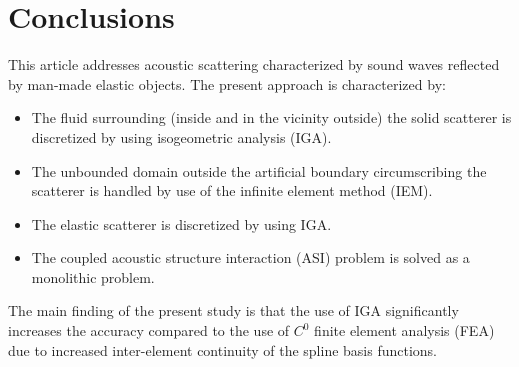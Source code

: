 \newpage
\section{Conclusions}
\label{Sec2:conclusions}
This article addresses acoustic scattering characterized by sound waves reflected by man-made elastic objects. The present approach is characterized by:
\begin{itemize}
	\item The fluid surrounding (inside and in the vicinity outside) the solid scatterer is discretized by using isogeometric analysis (IGA).
	\item The unbounded domain outside the artificial boundary circumscribing the scatterer is handled by use of the infinite element method (IEM).
	\item The elastic scatterer is discretized by using IGA.
	\item The coupled acoustic structure interaction (ASI) problem is solved as a monolithic problem.
\end{itemize}

The main finding of the present study is that the use of IGA significantly increases the accuracy compared to the use of $C^0$ finite element analysis (FEA) due to increased inter-element continuity of the spline basis functions.

